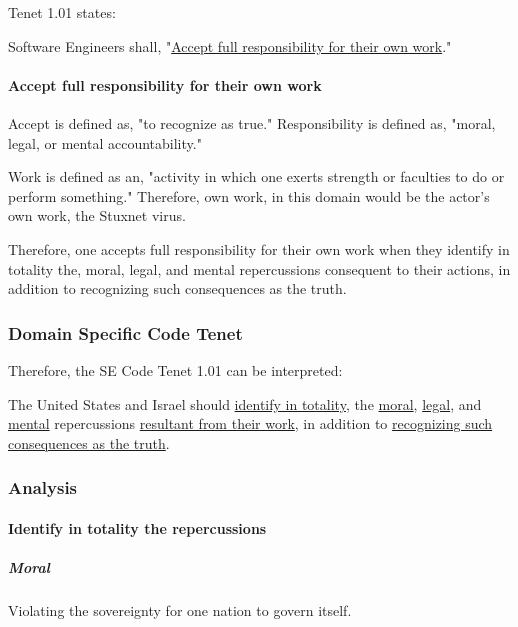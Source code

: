 \documentclass[12pt]{article}
\begin{document}
\begin{multicols}{2}
Tenet 1.01 states:
\begin{framed}
Software Engineers shall, "\ul{Accept full responsibility for their own work}."\cite{softwareEngineeringCodeOfEthics}
\end{framed}

\paragraph{Accept full responsibility for their own work}

Accept is defined as, "to recognize as true."\cite{merriamWebsterDefinitions} Responsibility is defined as, "moral, legal, or mental accountability."\cite{merriamWebsterDefinitions}

Work is defined as an, "activity in which one exerts strength or faculties to do or perform something."\cite{cambridgeDictionary} Therefore, own work, in this domain would be the actor's own work, the Stuxnet virus.

Therefore, one accepts full responsibility for their own work when they identify in totality  the, moral, legal, and mental repercussions consequent to their actions, in addition to recognizing such consequences as the truth.\cite{cambridgeDictionary}

\subsubsection{Domain Specific Code Tenet}

Therefore, the SE Code Tenet 1.01 can be interpreted:
\begin{framed}
The United States and Israel should \ul{identify in totality}, the \ul{moral}, \ul{legal}, and \ul{mental} repercussions \ul{resultant from their work}, in addition to \ul{recognizing such consequences as the truth}.
\end{framed}

\subsubsection{Analysis}

\paragraph{Identify in totality the repercussions}

\subparagraph{Moral}

Violating the sovereignty for one nation to govern itself.


\end{multicols}
\end{document}
